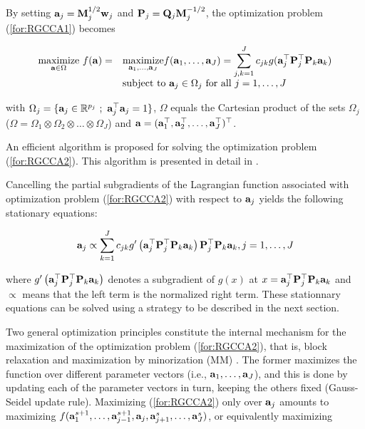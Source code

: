 \documentclass[
]{jss}
\begin{document}
By setting \(\mathbf{a}_j = \mathbf{M}_j^{1/2}\mathbf{w}_j\) and
\(\mathbf{P}_j = \mathbf{Q}_j\mathbf{M}_j^{-1/2}\), the optimization problem
(\ref{for:RGCCA1}) becomes

\begin{equation}
\begin{array}{ll}
 \displaystyle \underset{\mathbf{a} \in \Omega}{\text{maximize}} ~ f(\mathbf{a}) = &
\underset{\mathbf{a}_1, \ldots, \mathbf{a}_J}{\text{maximize}} f(\mathbf{a}_1, \ldots, \mathbf{a}_J) 
= \displaystyle \sum_{j, k=1}^J c_{jk}g(\mathbf{a}_j^\top\mathbf{P}_j^\top \mathbf{P}_k\mathbf{a}_k)\\
   &\mathrm{subject~to~} \mathbf{a}_j \in \Omega_j  \mbox{ for all }j = 1, \ldots, J
\end{array}
\label{for:RGCCA2}
\end{equation}

with
\(\Omega_j = \{\mathbf{a}_j \in \mathbb{R}^{p_j} ~;~ \mathbf{a}_j^\top\mathbf{a}_j = 1\}\),
\(\Omega\) equals the Cartesian product of the sets \(\Omega_j\)
(\(\Omega = \Omega_1 \otimes \Omega_2 \otimes \ldots \otimes\Omega_J\))
and
\(\mathbf{a} = (\mathbf{a}_1^\top, \mathbf{a}_2^\top, \ldots, \mathbf{a}_J^\top)^\top\).

An efficient algorithm is proposed for solving the optimization problem
(\ref{for:RGCCA2}). This algorithm is presented in detail in
\citep{Groenen2015}.

Cancelling the partial subgradients of the Lagrangian function
associated with optimization problem (\ref{for:RGCCA2}) with respect to
\(\mathbf{a}_j\) yields the following stationary equations:

\begin{equation} 
 \mathbf{a}_j \propto \displaystyle \sum_{k=1}^J c_{jk} g' 
\left(\mathbf{a}_j^\top\mathbf{P}_j^\top \mathbf{P}_k \mathbf{a}_k \right)\mathbf{P}_j^\top \mathbf{P}_k \mathbf{a}_k, j = 1, \ldots, J
 \label{stat_eq}
\end{equation}

where \(g'\left(\mathbf{a}_j^\top\mathbf{P}_j^\top \mathbf{P}_k \mathbf{a}_k \right)\)
denotes a subgradient of \(g(x)\) at
\(x=\mathbf{a}_j^\top\mathbf{P}_j^\top \mathbf{P}_k \mathbf{a}_k\) and \(\propto\) means
that the left term is the normalized right term. These stationnary
equations can be solved using a strategy to be described in the next
section.

Two general optimization principles constitute the internal mechanism
for the maximization of the optimization problem (\ref{for:RGCCA2}),
that is, block relaxation \citep{DeLeeuw1994} and maximization by
minorization (MM) \citep{Lange2010, Hunter2004}. The former maximizes
the function over different parameter vectors (i.e.,
\(\mathbf{a}_1, \ldots, \mathbf{a}_J\)), and this is done by updating each of
the parameter vectors in turn, keeping the others fixed (Gauss-Seidel
update rule). Maximizing (\ref{for:RGCCA2}) only over \(\mathbf{a}_j\)
amounts to maximizing
\(f(\mathbf{a}_1^{s+1}, \ldots, \mathbf{a}_{j-1}^{s+1}, \mathbf{a}_j, \mathbf{a}_{j+1}^s, \ldots, \mathbf{a}_J^s)\),
or equivalently maximizing
\end{document}
